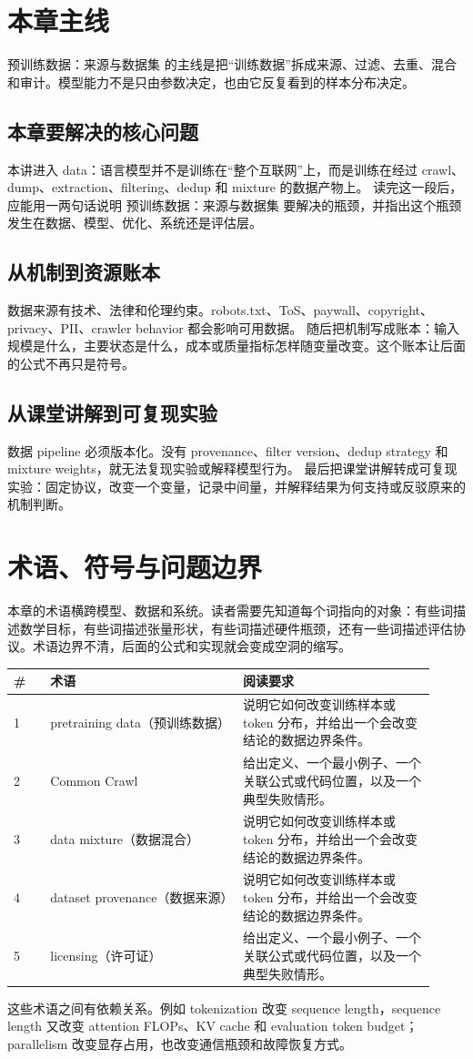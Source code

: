 \documentclass[a4paper]{article}
\begin{document}
\section{本章主线}
预训练数据：来源与数据集 的主线是把“训练数据”拆成来源、过滤、去重、混合和审计。模型能力不是只由参数决定，也由它反复看到的样本分布决定。
\subsection{本章要解决的核心问题}
本讲进入 data：语言模型并不是训练在“整个互联网”上，而是训练在经过 crawl、dump、extraction、filtering、dedup 和 mixture 的数据产物上。
读完这一段后，应能用一两句话说明 预训练数据：来源与数据集 要解决的瓶颈，并指出这个瓶颈发生在数据、模型、优化、系统还是评估层。
\subsection{从机制到资源账本}
数据来源有技术、法律和伦理约束。robots.txt、ToS、paywall、copyright、privacy、PII、crawler behavior 都会影响可用数据。
随后把机制写成账本：输入规模是什么，主要状态是什么，成本或质量指标怎样随变量改变。这个账本让后面的公式不再只是符号。
\subsection{从课堂讲解到可复现实验}
数据 pipeline 必须版本化。没有 provenance、filter version、dedup strategy 和 mixture weights，就无法复现实验或解释模型行为。
最后把课堂讲解转成可复现实验：固定协议，改变一个变量，记录中间量，并解释结果为何支持或反驳原来的机制判断。
\section{术语、符号与问题边界}
本章的术语横跨模型、数据和系统。读者需要先知道每个词指向的对象：有些词描述数学目标，有些词描述张量形状，有些词描述硬件瓶颈，还有一些词描述评估协议。术语边界不清，后面的公式和实现就会变成空洞的缩写。
\begin{longtable}{p{0.08\linewidth}p{0.42\linewidth}p{0.42\linewidth}}
\toprule
\textbf{\#} & \textbf{术语} & \textbf{阅读要求}\\
\midrule
1 & pretraining data（预训练数据） & 说明它如何改变训练样本或 token 分布，并给出一个会改变结论的数据边界条件。\\
2 & Common Crawl & 给出定义、一个最小例子、一个关联公式或代码位置，以及一个典型失败情形。\\
3 & data mixture（数据混合） & 说明它如何改变训练样本或 token 分布，并给出一个会改变结论的数据边界条件。\\
4 & dataset provenance（数据来源） & 说明它如何改变训练样本或 token 分布，并给出一个会改变结论的数据边界条件。\\
5 & licensing（许可证） & 给出定义、一个最小例子、一个关联公式或代码位置，以及一个典型失败情形。\\
\bottomrule
\end{longtable}
这些术语之间有依赖关系。例如 tokenization 改变 sequence length，sequence length 又改变 attention FLOPs、KV cache 和 evaluation token budget；parallelism 改变显存占用，也改变通信瓶颈和故障恢复方式。
\end{document}
